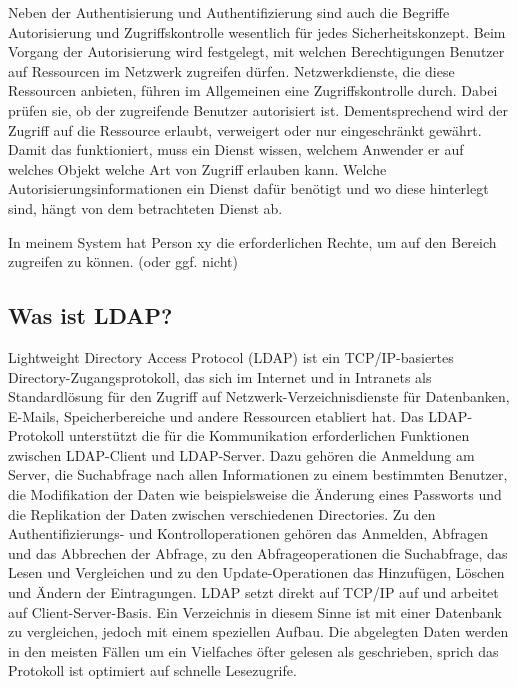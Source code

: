 \documentclass[letterpaper, 12pt]{article}
\let\tempsubsection\subsection
\renewcommand\subsection[1]{\vspace{0cm}\tempsubsection{#1}\vspace{0cm}}
\begin{document}
Neben der Authentisierung und Authentifizierung sind auch die Begriffe Autorisierung und Zugriffskontrolle wesentlich für jedes Sicherheitskonzept. Beim Vorgang der Autorisierung wird festgelegt, mit welchen Berechtigungen Benutzer auf Ressourcen im Netzwerk zugreifen dürfen. Netzwerkdienste, die diese Ressourcen anbieten, führen im Allgemeinen eine Zugriffskontrolle durch. Dabei prüfen sie, ob der zugreifende Benutzer autorisiert ist. Dementsprechend wird der Zugriff auf die Ressource erlaubt, verweigert oder nur eingeschränkt gewährt. Damit das funktioniert, muss ein Dienst wissen, welchem Anwender er auf welches Objekt welche Art von Zugriff erlauben kann. Welche Autorisierungsinformationen ein Dienst dafür benötigt und wo diese hinterlegt sind, hängt von dem betrachteten Dienst ab. \cite{ausarbeitungauth}

\begin{center}
In meinem System hat Person xy die erforderlichen Rechte, um auf den Bereich zugreifen zu können. (oder ggf. nicht)
\end{center}

\subsection{Was ist LDAP?}

Lightweight Directory Access Protocol (LDAP) ist ein TCP/IP-basiertes Directory-Zugangsprotokoll, das sich im Internet und in Intranets als Standardlösung für den Zugriff auf Netzwerk-\newline Verzeichnisdienste für Datenbanken, E-Mails, Speicherbereiche und andere Ressourcen etabliert hat. Das LDAP-Protokoll unterstützt die für die Kommunikation erforderlichen Funktionen zwischen LDAP-Client und LDAP-Server. Dazu gehören die Anmeldung am Server, die Suchabfrage nach allen Informationen zu einem bestimmten Benutzer, die Modifikation der Daten wie beispielsweise die Änderung eines Passworts und die Replikation der Daten zwischen verschiedenen Directories. Zu den Authentifizierungs- und Kontrolloperationen gehören das Anmelden, Abfragen und das Abbrechen der Abfrage, zu den Abfrageoperationen die Suchabfrage, das Lesen und Vergleichen und zu den Update-Operationen das Hinzufügen, Löschen und Ändern der Eintragungen. LDAP setzt direkt auf TCP/IP auf und arbeitet auf Client-Server-Basis. Ein Verzeichnis in diesem
Sinne ist mit einer Datenbank zu vergleichen, jedoch mit einem speziellen Aufbau. Die
abgelegten Daten werden in den meisten Fällen um ein Vielfaches öfter gelesen als
geschrieben, sprich das Protokoll ist optimiert auf schnelle Lesezugrife. \cite{LDAPInfo}
\end{document}
